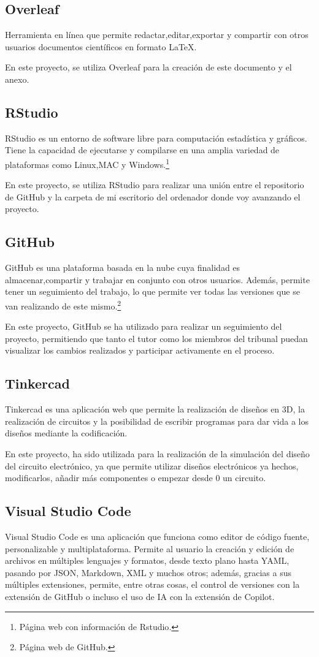 \subsection{Overleaf}
Herramienta en línea que permite redactar,editar,exportar y compartir con otros usuarios documentos científicos en formato LaTeX.

En este proyecto, se utiliza Overleaf para la creación de este documento y el anexo.
\subsection{RStudio}
RStudio es un entorno de software libre para computación estadística y gráficos. Tiene la capacidad de ejecutarse y compilarse en una amplia variedad de plataformas como Linux,MAC y Windows.\cite{Rstudio}\footnote{Página web con información de Rstudio\cite{Rstudio}.}

En este proyecto, se utiliza RStudio para realizar una unión entre el repositorio de GitHub y la carpeta de mi escritorio del ordenador donde voy avanzando el proyecto.
\subsection{GitHub}
GitHub es una plataforma basada en la nube cuya finalidad es almacenar,compartir y trabajar en conjunto con otros usuarios. 
Además, permite tener un seguimiento del trabajo, lo que permite ver todas las versiones que se van realizando de este mismo.\cite{GitHub}\footnote{Página web de GitHub\cite{GitHub}.} 

En este proyecto, GitHub se ha utilizado para realizar un seguimiento del proyecto, permitiendo que tanto el tutor como los miembros del tribunal puedan visualizar los cambios realizados y participar activamente en el proceso.
\subsection{Tinkercad}
Tinkercad es una aplicación web que permite la realización de diseños en 3D, la realización de circuitos y la posibilidad de escribir programas para dar vida a los diseños mediante la codificación.

En este proyecto, ha sido utilizada para la realización de la simulación del diseño del circuito electrónico, ya que permite utilizar diseños electrónicos ya hechos, modificarlos, añadir más componentes o empezar desde 0 un circuito.
\subsection{Visual Studio Code}
Visual Studio Code es una aplicación que funciona como editor de código fuente, personalizable y multiplataforma.
Permite al usuario la creación y edición de archivos en múltiples lenguajes y formatos, desde texto plano hasta YAML, pasando por JSON, Markdown, XML y muchos otros; además, gracias a sus múltiples extensiones, permite, entre otras cosas, el control de versiones con la extensión de GitHub o incluso el uso de IA con la extensión de Copilot.

